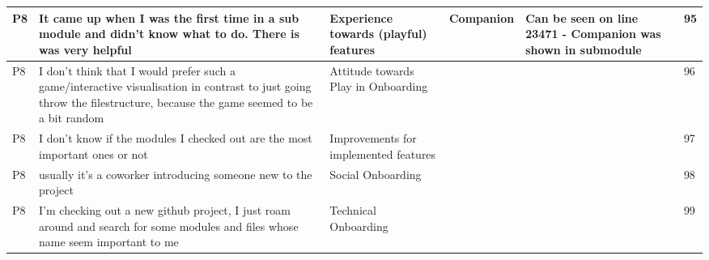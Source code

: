 \begin{appendices}
\begin{landscape}
\begin{longtable}{|p{0.8cm}|p{7cm}|p{3cm}|p{3cm}|p{5.5cm}|p{0.5cm}|}
      P8                   & It came up when I was the first time in a sub module and didn't know what to do. There is was very helpful                                                                                                                                                                  & Experience towards (playful) features    & Companion                          & Can be seen on line 23471 - Companion was shown in submodule                                                                                       & 95           \\ \hline
      P8                   & I don't think that I would prefer such a game/interactive visualisation in contrast to just going throw the filestructure, because the game seemed to be a bit random                                                                                                       & Attitude towards Play in Onboarding      &                                    &                                                                                                                                                    & 96           \\ \hline
      P8                   & I don't know if the modules I checked out are the most important ones or not                                                                                                                                                                                                & Improvements for implemented features    &                                    &                                                                                                                                                    & 97           \\ \hline
      P8                   & usually it's a coworker introducing someone new to the project                                                                                                                                                                                                              & Social Onboarding                        &                                    &                                                                                                                                                    & 98           \\ \hline
      P8                   & I'm checking out a new github project, I just roam around and search for some modules and files whose name seem important to me                                                                                                                                             & Technical Onboarding                     &                                    &                                                                                                                                                    & 99           \\ \hline

\end{longtable}
\end{landscape}
\end{appendices}
